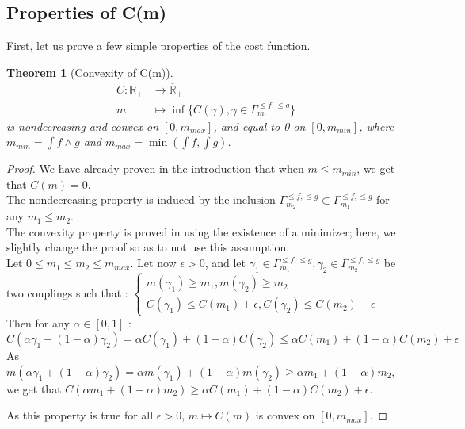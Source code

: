 \documentclass[a4paper,11pt]{article}
\newtheorem{theorem}{Theorem}
\theoremstyle{definition}
\begin{document}
\newpage

\subsection{Properties of C(m)} \label{ref:propertiesC}
First, let us prove a few simple properties of the cost function.
\begin{theorem}[Convexity of C(m)]
    \begin{align*}
     C :  \mathbb R_+ &\to   \overline{\mathbb R}_+ \\
      m  &\mapsto  \inf \{ C(\gamma),\gamma \in \Gamma^{\leq f,\leq g}_m \}
\end{align*} is nondecreasing and convex on $[0,m_{max}]$, and equal to 0 on $[0,m_{min}]$, where $m_{min} = \int f\land g$ and $m_{max} = \min(\int f,\int g)$.
\end{theorem}

\begin{proof}
    We have already proven in the introduction that when $m \leq m_{min}$, we get that $C(m) = 0$.  \\

    The nondecreasing property is induced by the inclusion $\Gamma^{\leq f, \leq g}_{m_2} \subset \Gamma^{\leq f, \leq g}_{m_1}$ for any $m_1 \leq m_2$.\\
    
    The convexity property is proved in \cite{fig} using the existence of a minimizer; here, we slightly change the proof so as to not use this assumption.\\
    
    Let $0\leq m_1 \leq m_2 \leq m_{max}$.
    Let now $\epsilon>0$, and let $\gamma_1 \in \Gamma^{\leq f, \leq g}_{m_1},\gamma_2 \in \Gamma^{\leq f, \leq g}_{m_2}$ be two couplings such that : $\begin{cases}
        m(\gamma_1) \geq m_1, m(\gamma_2) \geq m_2 \\
        C(\gamma_1) \leq C(m_1)+\epsilon, C(\gamma_2) \leq C(m_2)+\epsilon
    \end{cases}$\\
    
    
    Then for any $\alpha \in [0,1]$ : 
    $$C(\alpha \gamma_1 +(1-\alpha)\gamma_2) = \alpha C(\gamma_1)+ (1-\alpha)C(\gamma_2) \leq \alpha C(m_1)+ (1-\alpha)C(m_2)+\epsilon$$
    As $m(\alpha \gamma_1 +(1-\alpha)\gamma_2) = \alpha m(\gamma_1) +(1-\alpha)m(\gamma_2) \geq \alpha m_1 +(1-\alpha)m_2$, we get that $C(\alpha m_1 +(1-\alpha)m_2) \geq \alpha C(m_1)+ (1-\alpha)C(m_2) + \epsilon$.

    As this property is true for all $\epsilon>0$, $m \mapsto C(m)$ is convex on $[0,m_{max}]$.
\end{proof}
\end{document}
